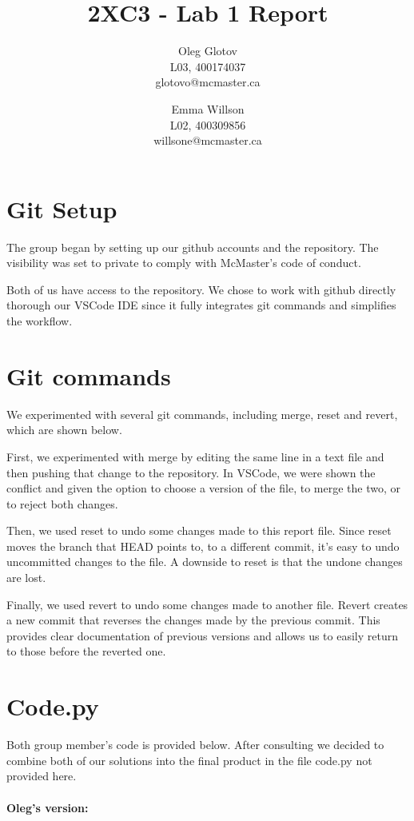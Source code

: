 \documentclass[twocolumn, 10pt]{article}
\title{2XC3 - Lab 1 Report}
\author{Oleg Glotov\\ L03, 400174037\\ glotovo@mcmaster.ca \and Emma Willson\\ L02, 400309856\\ willsone@mcmaster.ca}
\begin{document}
\maketitle
\section{Git Setup}\label{sec:git}
The group began by setting up our github accounts and the repository. The visibility was set to private to comply with McMaster's code of conduct.

Both of us have access to the repository. We chose to work with github directly thorough our VSCode IDE since it fully integrates git commands and simplifies the workflow.

\section{Git commands}

We experimented with several git commands, including merge, reset and revert, which are shown below. 

First, we experimented with merge by editing the same line in a text file and then pushing that change to the repository. In VSCode, we were shown the conflict and given the option to choose a version of the file, to merge the two, or to reject both changes.



Then, we used reset to undo some changes made to this report file. Since reset moves the branch that HEAD points to, to a different commit, it's easy to undo uncommitted changes to the file. A downside to reset is that the undone changes are lost.



Finally, we used revert to undo some changes made to another file. Revert creates a new commit that reverses the changes made by the previous commit. This provides clear documentation of previous versions and allows us to easily return to those before the reverted one.


\section{Code.py}

Both group member's code is provided below. After consulting we decided to combine both of our solutions into the final product in the file code.py not provided here.

\paragraph{Oleg's version:}
\end{document}
